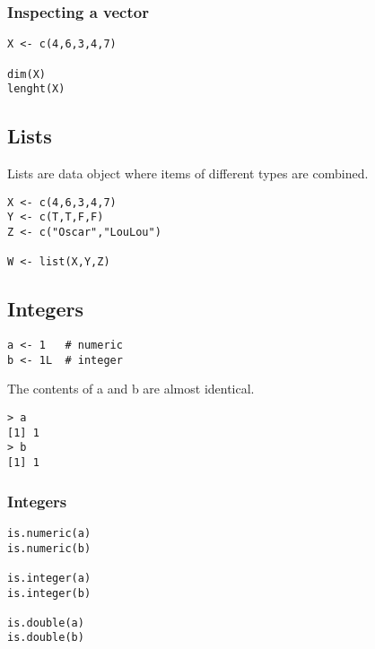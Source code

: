\subsubsection*{Inspecting a vector}
\begin{framed}
\begin{verbatim}
X <- c(4,6,3,4,7)

dim(X)
lenght(X)
\end{verbatim}
\end{framed}

\subsection*{Lists}
Lists are data object where items of different types are combined.

\begin{framed}
\begin{verbatim}
X <- c(4,6,3,4,7)
Y <- c(T,T,F,F)
Z <- c("Oscar","LouLou")

W <- list(X,Y,Z)
\end{verbatim}
\end{framed}

\subsection*{Integers}

\begin{framed}
\begin{verbatim}
a <- 1   # numeric
b <- 1L  # integer
\end{verbatim}
\end{framed}

The contents of a and b are almost identical.

\begin{verbatim}
> a
[1] 1
> b
[1] 1
\end{verbatim}
\subsubsection*{Integers}

\begin{framed}
\begin{verbatim}
is.numeric(a)
is.numeric(b)

is.integer(a)
is.integer(b)

is.double(a)
is.double(b)
\end{verbatim}
\end{framed}

